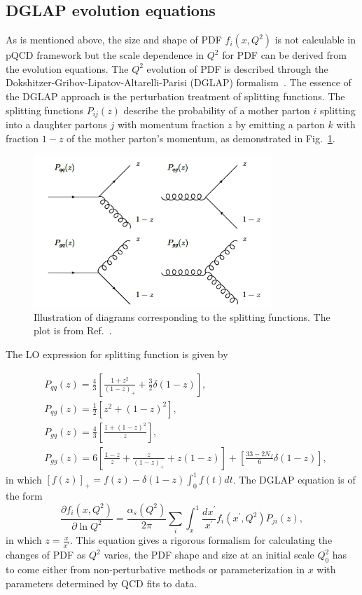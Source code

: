 \subsection{DGLAP evolution equations}
As is mentioned above, the size and shape of PDF $f_{i}(x,Q^{2})$ is not
calculable in pQCD framework but the scale dependence in $Q^{2}$ for PDF can be
derived from the evolution equations. The $Q^{2}$ evolution of PDF is described
through the Dokshitzer-Gribov-Lipatov-Altarelli-Parisi (DGLAP)
formalism~\cite{Dokshitzer:1977sg,Gribov:1972ri,Altarelli:1977zs}. The essence
of the DGLAP approach is the perturbation treatment of splitting functions. The
splitting functions $P_{ij}(z)$ describe the probability of a
mother parton $i$ splitting into a daughter partons $j$ with momentum fraction
$z$ by emitting a parton $k$ with fraction $1-z$ of the mother parton's
momentum, as demonstrated in Fig.~\ref{fig:split_fun}.

\begin{figure}
\centering
\includegraphics[width=0.8\textwidth]{plots/chpt2/split_fun.png}
\caption[Feynman diagrams corresponding to different splitting functions] {
Illustration of diagrams corresponding to the splitting functions. The plot is from Ref.~\cite{Belov:2013oda}. }
\label{fig:split_fun}
\end{figure}

The LO expression for splitting function is given by


\begin{align}
& P_{qq}(z)=\frac{4}{3}[\frac{1+z^{2}}{(1-z)_{+}}+\frac{3}{2}\delta(1-z)], \\
& P_{qg}(z)=\frac{1}{2}[z^{2}+(1-z)^{2}], \\
& P_{gq}(z)=\frac{4}{3}[\frac{1+(1-z)^{2}}{z}], \\
& P_{gg}(z)=6[\frac{1-z}{z}+\frac{z}{(1-z)_{+}}+z(1-z)]+[\frac{33-2N_{f}}{6}\delta(1-z)],
\end{align}
in which $[f(z)]_{+}=f(z)-\delta(1-z)\int^{1}_{0}f(t)dt$.
The DGLAP equation is of the form
\begin{equation}
\frac{\partial f_{i}(x,Q^{2})}{\partial \ln Q^{2}} = \frac{\alpha_{s}(Q^{2})}{2\pi}\sum_{i}\int^{1}_{x}\frac{dx^{'}}{x^{'}}f_{i}(x^{'},Q^{2})P_{ji}(z),
\end{equation}
in which $z=\frac{x}{x^{'}}$.
This equation gives a rigorous formalism for calculating the changes of PDF
as $Q^{2}$ varies, the PDF shape and size at an initial scale $Q^{2}_{0}$ has to
come either from non-perturbative methods or parameterization in $x$ with
parameters determined by QCD fits to data.

